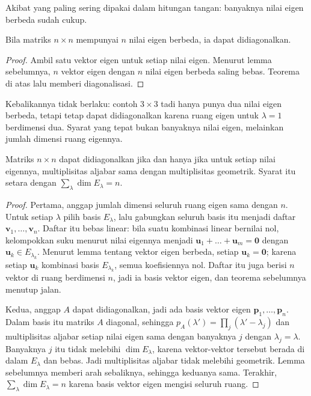 Akibat yang paling sering dipakai dalam hitungan tangan: banyaknya nilai eigen berbeda sudah cukup.

\begin{akibat}
Bila matriks $n\times n$ mempunyai $n$ nilai eigen berbeda, ia dapat didiagonalkan.
\end{akibat}

\begin{proof}
Ambil satu vektor eigen untuk setiap nilai eigen. Menurut lemma sebelumnya, $n$ vektor eigen
dengan $n$ nilai eigen berbeda saling bebas. Teorema di atas lalu memberi diagonalisasi.
\end{proof}

Kebalikannya tidak berlaku: contoh $3\times3$ tadi hanya punya dua nilai eigen berbeda, tetapi
tetap dapat didiagonalkan karena ruang eigen untuk $\lambda=1$ berdimensi dua. Syarat yang tepat
bukan banyaknya nilai eigen, melainkan jumlah dimensi ruang eigennya.

\begin{teorema}
Matriks $n\times n$ dapat didiagonalkan jika dan hanya jika untuk setiap nilai eigennya,
multiplisitas aljabar sama dengan multiplisitas geometrik. Syarat itu setara dengan
$\sum_{\lambda}\dim E_{\lambda}=n$.
\end{teorema}

\begin{proof}
Pertama, anggap jumlah dimensi seluruh ruang eigen sama dengan $n$. Untuk setiap $\lambda$ pilih
basis $E_{\lambda}$, lalu gabungkan seluruh basis itu menjadi daftar $\mathbf{v}_{1},\dots,
\mathbf{v}_{n}$. Daftar itu bebas linear: bila suatu kombinasi linear bernilai nol, kelompokkan
suku menurut nilai eigennya menjadi $\mathbf{u}_{1}+\dots+\mathbf{u}_{m}=\mathbf{0}$ dengan
$\mathbf{u}_{k}\in E_{\lambda_{k}}$. Menurut lemma tentang vektor eigen berbeda, setiap
$\mathbf{u}_{k}=\mathbf{0}$; karena setiap $\mathbf{u}_{k}$ kombinasi basis $E_{\lambda_{k}}$,
semua koefisiennya nol. Daftar itu juga berisi $n$ vektor di ruang berdimensi $n$, jadi ia basis
vektor eigen, dan teorema sebelumnya menutup jalan.

Kedua, anggap $A$ dapat didiagonalkan, jadi ada basis vektor eigen
$\mathbf{p}_{1},\dots,\mathbf{p}_{n}$. Dalam basis itu matriks $A$ diagonal, sehingga
$p_{A}(\lambda')=\prod_{j}(\lambda'-\lambda_{j})$ dan multiplisitas aljabar setiap nilai eigen
sama dengan banyaknya $j$ dengan $\lambda_{j}=\lambda$. Banyaknya $j$ itu tidak melebihi
$\dim E_{\lambda}$, karena vektor-vektor tersebut berada di dalam $E_{\lambda}$ dan bebas. Jadi
multiplisitas aljabar tidak melebihi geometrik. Lemma sebelumnya memberi arah sebaliknya, sehingga
keduanya sama. Terakhir, $\sum_{\lambda}\dim E_{\lambda}=n$ karena basis vektor eigen mengisi
seluruh ruang.
\end{proof}

